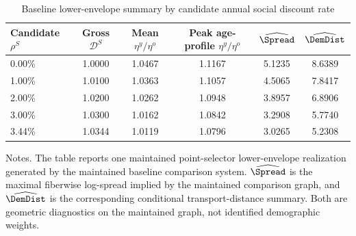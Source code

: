 \begin{table}[t]
\centering
\caption{Baseline lower-envelope summary by candidate annual social discount rate}
\label{tab:baseline-results}
\begin{tabular}{lccccc}
\toprule
Candidate $\rho^{S}$ & Gross $\mathcal{D}^{S}$ & Mean $\eta^{y}/\eta^{o}$ & Peak age-profile $\eta^{y}/\eta^{o}$ & $\widehat{\Spread}$ & $\widehat{\DemDist}$ \\
\midrule
0.00\% & 1.0000 & 1.0467 & 1.1167 & 5.1235 & 8.6389 \\
1.00\% & 1.0100 & 1.0363 & 1.1057 & 4.5065 & 7.8417 \\
2.00\% & 1.0200 & 1.0262 & 1.0948 & 3.8957 & 6.8906 \\
3.00\% & 1.0300 & 1.0162 & 1.0842 & 3.2908 & 5.7740 \\
3.44\% & 1.0344 & 1.0119 & 1.0796 & 3.0265 & 5.2308 \\
\bottomrule
\end{tabular}
\begin{minipage}{0.92\textwidth}
\vspace{0.35em}
\footnotesize Notes. The table reports one maintained point-selector lower-envelope realization generated by the maintained baseline comparison system. $\widehat{\Spread}$ is the maximal fiberwise log-spread implied by the maintained comparison graph, and $\widehat{\DemDist}$ is the corresponding conditional transport-distance summary. Both are geometric diagnostics on the maintained graph, not identified demographic weights.
\end{minipage}
\end{table}
